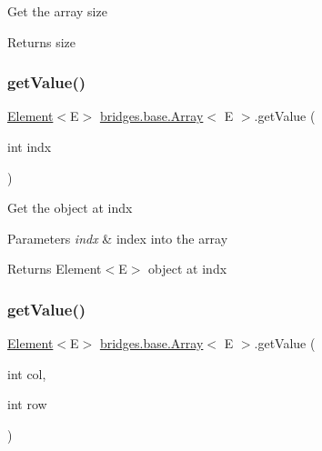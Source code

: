Get the array size

\begin{DoxyReturn}{Returns}
size 
\end{DoxyReturn}
\hypertarget{classbridges_1_1base_1_1_array_a40ba0fd6fb558c871e70691521e1c729}{}\label{classbridges_1_1base_1_1_array_a40ba0fd6fb558c871e70691521e1c729} 
\subsubsection{\texorpdfstring{get\+Value()}{getValue()}\hspace{0.1cm}{\footnotesize\ttfamily [1/3]}}
{\footnotesize\ttfamily \hyperlink{classbridges_1_1base_1_1_element}{Element}$<$E$>$ \hyperlink{classbridges_1_1base_1_1_array}{bridges.\+base.\+Array}$<$ E $>$.get\+Value (\begin{DoxyParamCaption}\item[{int}]{indx }\end{DoxyParamCaption})}

Get the object at \textquotesingle{}indx\textquotesingle{}


\begin{DoxyParams}{Parameters}
{\em indx} & index into the array \\
\hline
\end{DoxyParams}
\begin{DoxyReturn}{Returns}
Element$<$\+E$>$ object at \textquotesingle{}indx\textquotesingle{} 
\end{DoxyReturn}
\hypertarget{classbridges_1_1base_1_1_array_af777e1e68a1c91d22e4cb50db76e7bb6}{}\label{classbridges_1_1base_1_1_array_af777e1e68a1c91d22e4cb50db76e7bb6} 
\subsubsection{\texorpdfstring{get\+Value()}{getValue()}\hspace{0.1cm}{\footnotesize\ttfamily [2/3]}}
{\footnotesize\ttfamily \hyperlink{classbridges_1_1base_1_1_element}{Element}$<$E$>$ \hyperlink{classbridges_1_1base_1_1_array}{bridges.\+base.\+Array}$<$ E $>$.get\+Value (\begin{DoxyParamCaption}\item[{int}]{col,  }\item[{int}]{row }\end{DoxyParamCaption})}

